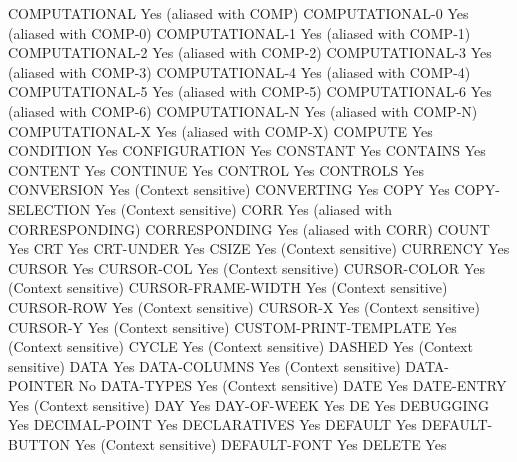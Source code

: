 COMPUTATIONAL                   Yes (aliased with COMP)
COMPUTATIONAL-0                 Yes (aliased with COMP-0)
COMPUTATIONAL-1                 Yes (aliased with COMP-1)
COMPUTATIONAL-2                 Yes (aliased with COMP-2)
COMPUTATIONAL-3                 Yes (aliased with COMP-3)
COMPUTATIONAL-4                 Yes (aliased with COMP-4)
COMPUTATIONAL-5                 Yes (aliased with COMP-5)
COMPUTATIONAL-6                 Yes (aliased with COMP-6)
COMPUTATIONAL-N                 Yes (aliased with COMP-N)
COMPUTATIONAL-X                 Yes (aliased with COMP-X)
COMPUTE                         Yes
CONDITION                       Yes
CONFIGURATION                   Yes
CONSTANT                        Yes
CONTAINS                        Yes
CONTENT                         Yes
CONTINUE                        Yes
CONTROL                         Yes
CONTROLS                        Yes
CONVERSION                      Yes (Context sensitive)
CONVERTING                      Yes
COPY                            Yes
COPY-SELECTION                  Yes (Context sensitive)
CORR                            Yes (aliased with CORRESPONDING)
CORRESPONDING                   Yes (aliased with CORR)
COUNT                           Yes
CRT                             Yes
CRT-UNDER                       Yes
CSIZE                           Yes (Context sensitive)
CURRENCY                        Yes
CURSOR                          Yes
CURSOR-COL                      Yes (Context sensitive)
CURSOR-COLOR                    Yes (Context sensitive)
CURSOR-FRAME-WIDTH              Yes (Context sensitive)
CURSOR-ROW                      Yes (Context sensitive)
CURSOR-X                        Yes (Context sensitive)
CURSOR-Y                        Yes (Context sensitive)
CUSTOM-PRINT-TEMPLATE           Yes (Context sensitive)
CYCLE                           Yes (Context sensitive)
DASHED                          Yes (Context sensitive)
DATA                            Yes
DATA-COLUMNS                    Yes (Context sensitive)
DATA-POINTER                    No
DATA-TYPES                      Yes (Context sensitive)
DATE                            Yes
DATE-ENTRY                      Yes (Context sensitive)
DAY                             Yes
DAY-OF-WEEK                     Yes
DE                              Yes
DEBUGGING                       Yes
DECIMAL-POINT                   Yes
DECLARATIVES                    Yes
DEFAULT                         Yes
DEFAULT-BUTTON                  Yes (Context sensitive)
DEFAULT-FONT                    Yes
DELETE                          Yes
